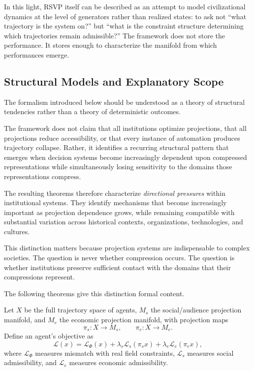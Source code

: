 \documentclass[12pt, a4paper]{article}
\theoremstyle{plain}
\theoremstyle{definition}
\theoremstyle{remark}
\begin{document}
In this light, RSVP itself can be described as an attempt to model civilizational
dynamics at the level of generators rather than realized states: to ask not
``what trajectory is the system on?'' but ``what is the constraint structure
determining which trajectories remain admissible?''
The framework does not store the performance.
It stores enough to characterize the manifold from which performances emerge.

\subsection*{Structural Models and Explanatory Scope}

The formalism introduced below should be understood as a theory of structural
tendencies rather than a theory of deterministic outcomes.

The framework does not claim that all institutions optimize projections, that all
projections reduce accessibility, or that every instance of automation produces
trajectory collapse.
Rather, it identifies a recurring structural pattern that emerges when decision
systems become increasingly dependent upon compressed representations while
simultaneously losing sensitivity to the domains those representations compress.

The resulting theorems therefore characterize \emph{directional pressures} within
institutional systems.
They identify mechanisms that become increasingly important as projection dependence
grows, while remaining compatible with substantial variation across historical
contexts, organizations, technologies, and cultures.

This distinction matters because projection systems are indispensable to complex
societies.
The question is never whether compression occurs.
The question is whether institutions preserve sufficient contact with the domains
that their compressions represent.

The following theorems give this distinction formal content.

Let $X$ be the full trajectory space of agents, $M_s$ the social/audience projection
manifold, and $M_e$ the economic projection manifold, with projection maps
\[
\pi_s : X \to M_s, \qquad \pi_e : X \to M_e.
\]
Define an agent's objective as
\[
\mathcal{L}(x)
= \mathcal{L}_\Phi(x)
+ \lambda_s \mathcal{L}_s(\pi_s x)
+ \lambda_e \mathcal{L}_e(\pi_e x),
\]
where $\mathcal{L}_\Phi$ measures mismatch with real field constraints,
$\mathcal{L}_s$ measures social admissibility, and $\mathcal{L}_e$ measures
economic admissibility.
\end{document}
